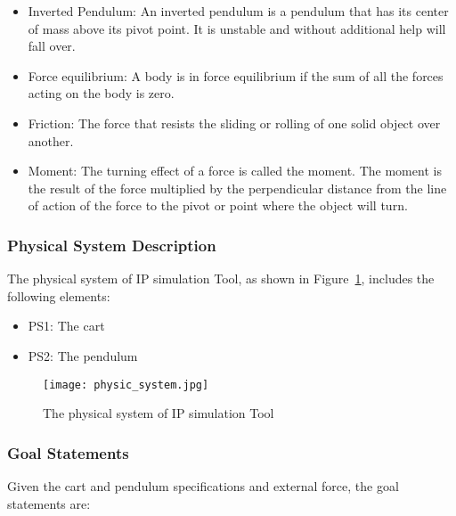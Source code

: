 \documentclass[12pt]{article}
\begin{document}
\begin{itemize}
\item{Inverted Pendulum: An inverted pendulum is a pendulum that has its center of mass above its pivot point. It is unstable and without additional help will fall over.}

\item {Force equilibrium: A body is in force equilibrium if the sum of all the forces acting on the body is zero.}

\item{Friction: The force that resists the sliding or rolling of one solid object over another.}

\item{ Moment: The turning effect of a force is called the moment. The moment is the result of the force multiplied by the perpendicular distance from the line of action of the force to the pivot or point where the object will turn.}
\end{itemize}

\subsubsection{Physical System Description} \label{sec_phySystDescrip}
  
The physical system of IP simulation Tool, as shown in Figure~\ref{fig_physys},
includes the following elements:

\begin{itemize}

\item{PS1: The cart}
\item{PS2: The pendulum}

\end{itemize}


 \begin{figure}[h!]
\begin{center}
 
\texttt{[image: physic\_system.jpg]}
 \caption{The physical system of IP simulation Tool}
 \label{fig_physys}
 \end{center}
 \end{figure}
 
\subsubsection{Goal Statements}
 Given the cart and pendulum specifications and external force, the goal statements are:
\end{document}
